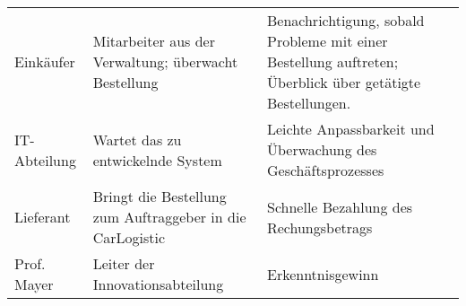 \begin{table}[bh]
\begin{longtable}[]{@{}lll@{}}
\begin{minipage}[t]{0.19\columnwidth}
Einkäufer\strut
\end{minipage} & \begin{minipage}[t]{0.27\columnwidth}\raggedright\strut
Mitarbeiter aus der Verwaltung; überwacht Bestellung\strut
\end{minipage} & \begin{minipage}[t]{0.46\columnwidth}\raggedright\strut
Benachrichtigung, sobald Probleme mit einer Bestellung auftreten; Überblick über getätigte Bestellungen.\strut
\end{minipage}\tabularnewline
\begin{minipage}[t]{0.19\columnwidth}\raggedright\strut
IT-Abteilung\strut
\end{minipage} & \begin{minipage}[t]{0.27\columnwidth}\raggedright\strut
Wartet das zu entwickelnde System\strut
\end{minipage} & \begin{minipage}[t]{0.46\columnwidth}\raggedright\strut
Leichte Anpassbarkeit und Überwachung des Geschäftsprozesses\strut
\end{minipage}\tabularnewline
\begin{minipage}[t]{0.19\columnwidth}\raggedright\strut
Lieferant\strut
\end{minipage} & \begin{minipage}[t]{0.27\columnwidth}\raggedright\strut
Bringt die Bestellung zum Auftraggeber in die CarLogistic\strut
\end{minipage} & \begin{minipage}[t]{0.46\columnwidth}\raggedright\strut
Schnelle Bezahlung des Rechungsbetrags\strut
\end{minipage}\tabularnewline
\begin{minipage}[t]{0.19\columnwidth}\raggedright\strut
Prof. Mayer\strut
\end{minipage} & \begin{minipage}[t]{0.27\columnwidth}\raggedright\strut
Leiter der Innovationsabteilung\strut
\end{minipage} & \begin{minipage}[t]{0.46\columnwidth}\raggedright\strut
Erkenntnisgewinn\strut
\end{minipage}\tabularnewline
\bottomrule
\end{longtable}
\end{table}
